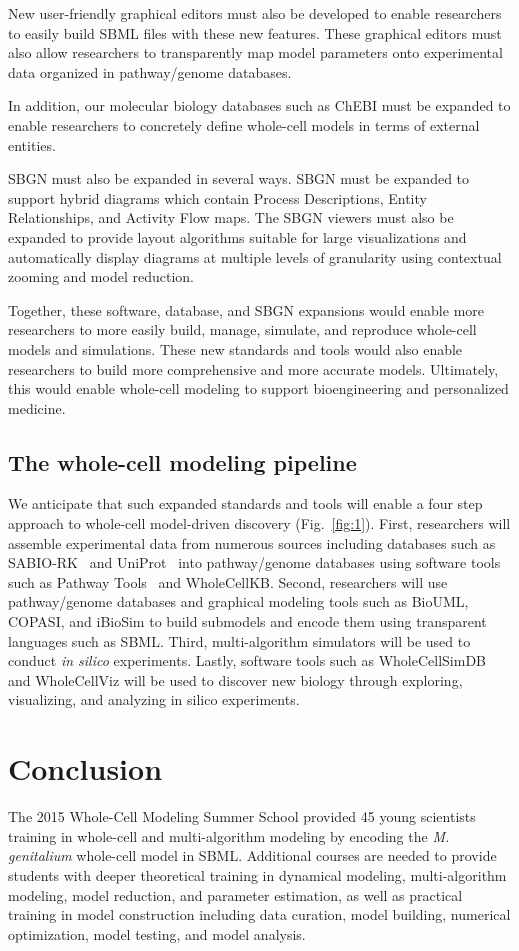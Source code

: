 \documentclass[journal,transmag]{IEEEtran}
\begin{document}
New user-friendly graphical editors must also be developed to enable researchers to easily build SBML files with these new features. These graphical editors must also allow researchers to transparently map model parameters onto experimental data organized in pathway/genome databases.

In addition, our molecular biology databases such as ChEBI must be expanded to enable researchers to concretely define whole-cell models in terms of external entities. 

SBGN must also be expanded in several ways. SBGN must be expanded to support hybrid diagrams which contain Process Descriptions, Entity Relationships, and Activity Flow maps. The SBGN viewers must also be expanded to provide layout algorithms suitable for large visualizations and automatically display diagrams at multiple levels of granularity using contextual zooming and model reduction. 

Together, these software, database, and SBGN expansions would enable more researchers to more easily build, manage, simulate, and reproduce whole-cell models and simulations. These new standards and tools would also enable researchers to build more comprehensive and more accurate models. Ultimately, this would enable whole-cell modeling to support bioengineering and personalized medicine.

\subsection{The whole-cell modeling pipeline}
We anticipate that such expanded standards and tools will enable a four step approach to whole-cell model-driven discovery (Fig.~\ref{fig:1}). First, researchers will assemble experimental data from numerous sources including databases such as SABIO-RK~\cite{Wittig2012} and UniProt~\cite{UniProt2015} into pathway/genome databases using software tools such as Pathway Tools~\cite{Karp2010} and WholeCellKB. Second, researchers will use pathway/genome databases and graphical modeling tools such as BioUML, COPASI, and iBioSim to build submodels and encode them using transparent languages such as SBML. Third, multi-algorithm simulators will be used to conduct \textit{in silico} experiments. Lastly, software tools such as WholeCellSimDB and WholeCellViz will be used to discover new biology through exploring, visualizing, and analyzing in silico experiments.

\section{Conclusion}
The 2015 Whole-Cell Modeling Summer School provided 45 young scientists training in whole-cell and multi-algorithm modeling by encoding the \textit{M. genitalium} whole-cell model in SBML. Additional courses are needed to provide students with deeper theoretical training in dynamical modeling, multi-algorithm modeling, model reduction, and parameter estimation, as well as practical training in model construction including data curation, model building, numerical optimization, model testing, and model analysis.
\end{document}
